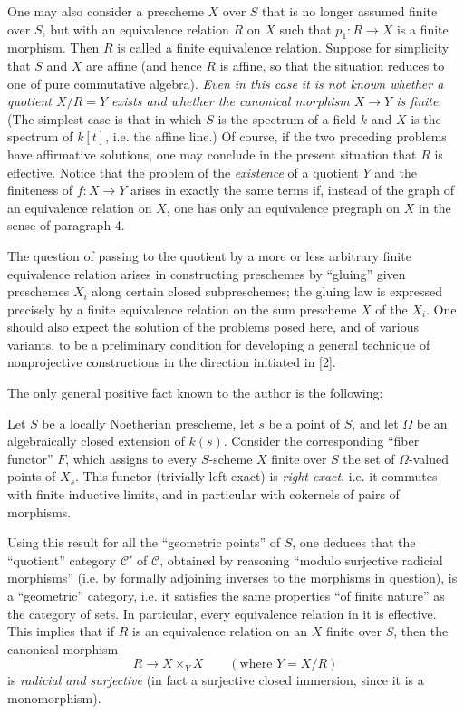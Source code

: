 One may also consider a prescheme $X$ over $S$ that is no longer assumed
finite over $S$, but with an equivalence relation $R$ on $X$ such that
$p_1:R\longrightarrow X$ is a finite morphism. Then $R$ is called a finite
equivalence relation. Suppose for simplicity that $S$ and $X$ are affine (and
hence $R$ is affine, so that the situation reduces to one of pure commutative
algebra). \emph{Even in this case it is not known whether a quotient $X/R=Y$
exists and whether the canonical morphism $X\longrightarrow Y$ is finite}.
(The simplest case is that in which $S$ is the spectrum of a field $k$ and
$X$ is the spectrum of $k[t]$, i.e. the affine line.) Of course, if the two
preceding problems have affirmative solutions, one may conclude in the present
situation that $R$ is effective. Notice that the problem of the
\emph{existence} of a quotient $Y$ and the finiteness of
$f:X\longrightarrow Y$ arises in exactly the same terms if, instead of the
graph of an equivalence relation on $X$, one has only an equivalence pregraph
on $X$ in the sense of paragraph 4.

The question of passing to the quotient by a more or less arbitrary finite
equivalence relation arises in constructing preschemes by ``gluing'' given
preschemes $X_i$ along certain closed subpreschemes; the gluing law is
expressed precisely by a finite equivalence relation on the sum prescheme $X$
of the $X_i$. One should also expect the solution of the problems posed here,
and of various variants, to be a preliminary condition for developing a
general technique of nonprojective constructions in the direction initiated
in [2].

The only general positive fact known to the author is the following:

 Let $S$ be a locally Noetherian prescheme, let $s$
be a point of $S$, and let $\Omega$ be an algebraically closed extension of
$k(s)$. Consider the
corresponding ``fiber functor'' $F$, which assigns to every $S$-scheme
$X$ finite over $S$ the set of $\Omega$-valued points of $X_s$. This functor
(trivially left exact) is \emph{right exact}, i.e. it commutes with finite
inductive limits, and in particular with cokernels of pairs of morphisms.

Using this result for all the ``geometric points'' of $S$, one deduces that
the ``quotient'' category $\mathcal C'$ of $\mathcal C$, obtained by reasoning
``modulo surjective radicial morphisms'' (i.e. by formally adjoining inverses
to the morphisms in question), is a ``geometric'' category, i.e. it satisfies
the same properties ``of finite nature'' as the category of sets. In
particular, every equivalence relation in it is effective. This implies that
if $R$ is an equivalence relation on an $X$ finite over $S$, then the canonical
morphism
\[
  R\longrightarrow X\times_Y X\qquad (\text{where }Y=X/R)
\]
is \emph{radicial and surjective} (in fact a surjective closed immersion,
since it is a monomorphism).

